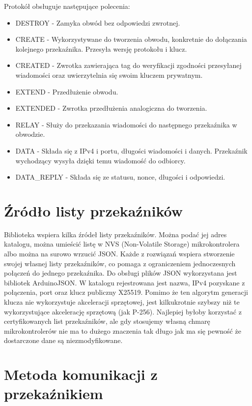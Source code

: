 \documentclass[thesis=inz,faculty=ee]{EE-dyplom}
\begin{document}
    Protokół obsługuje następujące polecenia: 

    \begin{itemize}
        \item DESTROY - Zamyka obwód bez odpowiedzi zwrotnej.
        \item CREATE - Wykorzystywane do tworzenia obwodu, konkretnie do dołączania kolejnego przekaźnika. Przesyła wersję protokołu i klucz.
        \item CREATED - Zwrotka zawierająca tag do weryfikacji zgodności przesyłanej wiadomości oraz uwierzytelnia się swoim kluczem prywatnym. 
        \item EXTEND - Przedłużenie obwodu.
        \item EXTENDED - Zwrotka przedłużenia analogiczna do tworzenia.
        \item RELAY - Służy do przekazania wiadomości do następnego przekaźnika w obwodzie.
        \item DATA - Składa się z IPv4 i portu, długości wiadomości i danych. Przekaźnik wychodzący wysyła dzięki temu wiadomość do odbiorcy.
        \item DATA\_REPLY - Składa się ze statusu, nonce, długości i odpowiedzi.
    \end{itemize}

    \section{Źródło listy przekaźników}

    Biblioteka wspiera kilka źródeł listy przekaźników. Można podać jej adres katalogu, można umieścić listę w NVS (Non-Volatile Storage) mikrokontrolera
    albo można na surowo wrzucić JSON. Każde z rozwiązań wspiera stworzenie swojej własnej listy przekaźników, co pomaga z ograniczeniem jednoczesnych 
    połączeń do jednego przekaźnika. Do obsługi plików JSON wykorzystana jest bibliotek ArduinoJSON\cite{json_spec}. W katalogu rejestrowana jest nazwa, IPv4
    pozyskane z połączenia, port oraz klucz publiczny X25519. Pomimo że ten algorytm generacji klucza nie wykorzystuje akceleracji sprzętowej, jest kilkukrotnie 
    szybszy niż te wykorzystujące akcelerację sprzętową (jak P-256)\cite{cryptobench}. Najlepiej byłoby korzystać z certyfikowanych list przekaźników, ale 
    gdy stosujemy własną chmarę mikrokontrolerów nie ma to dużego znaczenia tak długo jak ma się pewność że dostarczone dane są niezmodyfikowane.

    \section{Metoda komunikacji z przekaźnikiem}
\end{document}
